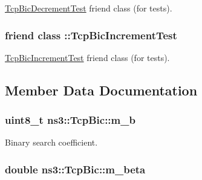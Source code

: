 \hyperlink{classTcpBicDecrementTest}{Tcp\+Bic\+Decrement\+Test} friend class (for tests). 

\subsubsection[{\texorpdfstring{\+::\+Tcp\+Bic\+Increment\+Test}{::TcpBicIncrementTest}}]{\setlength{\rightskip}{0pt plus 5cm}friend class \+::{\bf Tcp\+Bic\+Increment\+Test}\hspace{0.3cm}{\ttfamily [friend]}}\hypertarget{classns3_1_1TcpBic_a82f141cadbdca4c006cec6e378649e80}{}\label{classns3_1_1TcpBic_a82f141cadbdca4c006cec6e378649e80}


\hyperlink{classTcpBicIncrementTest}{Tcp\+Bic\+Increment\+Test} friend class (for tests). 



\subsection{Member Data Documentation}
\subsubsection[{\texorpdfstring{m\+\_\+b}{m_b}}]{\setlength{\rightskip}{0pt plus 5cm}uint8\+\_\+t ns3\+::\+Tcp\+Bic\+::m\+\_\+b\hspace{0.3cm}{\ttfamily [private]}}\hypertarget{classns3_1_1TcpBic_a3f94d435d1b4821077da9acb72fd8d5f}{}\label{classns3_1_1TcpBic_a3f94d435d1b4821077da9acb72fd8d5f}


Binary search coefficient. 

\subsubsection[{\texorpdfstring{m\+\_\+beta}{m_beta}}]{\setlength{\rightskip}{0pt plus 5cm}double ns3\+::\+Tcp\+Bic\+::m\+\_\+beta\hspace{0.3cm}{\ttfamily [private]}}\hypertarget{classns3_1_1TcpBic_a899269934e13c92129fec020cc09256e}{}\label{classns3_1_1TcpBic_a899269934e13c92129fec020cc09256e}


